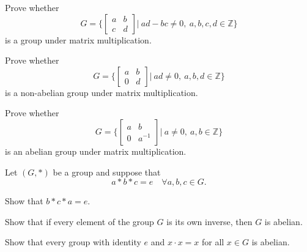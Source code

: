 \begin{mdframed}
    \vspace{0.752cm}
    \begin{Exercise}
        Prove whether 
        \[
            G = \biggl\{ \begin{bmatrix}
            a & b \\ c & d
            \end{bmatrix} \bigg \vert \> ad - bc \neq 0,\> a,b,c,d \in \mathbb{Z} \biggr\}
        \]
        is a group under matrix multiplication.
    \end{Exercise}

    \vspace{0.752cm}
    \begin{Exercise}
        Prove whether 
        \[
            G = \biggl\{ \begin{bmatrix}
            a & b \\ 0 & d
            \end{bmatrix} \bigg \vert \> ad \neq 0,\> a,b,d \in \mathbb{Z} \biggr\}
        \]
        is a non-abelian group under matrix multiplication.
    \end{Exercise}

    \vspace{0.752cm}
    \begin{Exercise}
        Prove whether 
        \[
            G = \biggl\{ \begin{bmatrix}
            a & b \\ 0 & a^{-1}
            \end{bmatrix} \bigg \vert \> a \neq 0,\> a,b \in \mathbb{Z} \biggr\}
        \]
        is an abelian group under matrix multiplication.
    \end{Exercise}

    \vspace{0.752cm}
    \begin{Exercise}
        Let $(G, *)$ be a group and suppose that 
        \[
            a * b * c = e \quad \forall a,b,c \in G.
        \]

        Show that $b * c * a = e$.
    \end{Exercise}

    \vspace{0.752cm}
    \begin{Exercise}
        Show that if every element of the group $G$ is its own inverse, then $G$ is abelian.
    \end{Exercise}

    \vspace{0.752cm}
    \begin{Exercise}
        Show that every group with identity $e$ and $x \cdot x = x$ for all $x \in G$ is abelian.
    \end{Exercise}


\end{mdframed}
